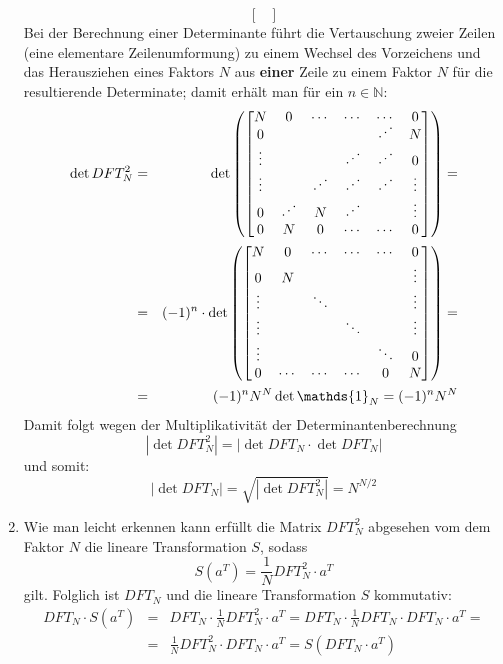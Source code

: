 \begin{enumerate}[1.]
\[\begin{bmatrix}
	\end{bmatrix} \]
	Bei der Berechnung einer Determinante führt die Vertauschung zweier Zeilen
	(eine elementare Zeilenumformung) zu einem Wechsel des Vorzeichens und das
	Herausziehen eines Faktors $N$ aus {\bf einer} Zeile zu einem Faktor $N$ für die
	resultierende Determinate; damit erhält man für ein $n \in \mathbb{N}$:
	\begin{eqnarray*}
	\det DFT_N^2 &=& \det \left( \begin{bmatrix}
		N      & 0      & \cdots & \cdots & \cdots & 0      \\
		0      &        &        &        & \Ddots & N      \\
		\vdots &        &        & \Ddots & \Ddots & 0      \\
		\vdots &        & \Ddots & \Ddots & \Ddots & \vdots \\
		0      & \Ddots & N      & \Ddots &        & \vdots \\
		0      & N      & 0      & \cdots & \cdots & 0      \\
	\end{bmatrix} \right) = \\
	& = & (-1)^n \cdot \det \left( \begin{bmatrix}
		N      & 0      & \cdots & \cdots & \cdots & 0      \\
		0      & N      &        &        &        & \vdots \\
		\vdots &       & \ddots &        &        & \vdots \\
		\vdots &        &        & \ddots &        & \vdots \\
		\vdots &        &        &        & \ddots & 0      \\
		0      & \cdots & \cdots & \cdots & 0      & N      \\
	\end{bmatrix} \right) = \\
	&=& (-1)^n N^N \det \mathds{1}_N = (-1)^n N^N \\
	\end{eqnarray*}
	Damit folgt wegen der Multiplikativität der Determinantenberechnung
	\[ | \det DFT_N^2 | = |\det DFT_N \cdot \det DFT_N| \]
	und somit:
	\[ | \det DFT_N | = \sqrt{|\det DFT_N^2|} = N^{N/2} \]

	\item Wie man leicht erkennen kann erfüllt die Matrix $DFT_N^2$ abgesehen vom dem
	Faktor $N$ die lineare Transformation $S$, sodass
	\[ S(a^T) = \frac{1}{N} DFT_N^2 \cdot a^T \]
	gilt.
	Folglich ist $DFT_N$ und die lineare Transformation $S$ kommutativ:
	\begin{eqnarray*}
	DFT_N \cdot S(a^T) &=& DFT_N \cdot \frac{1}{N}DFT_N^2 \cdot a^T = DFT_N \cdot \frac{1}{N} DFT_N \cdot DFT_N \cdot a^T = \\
	&=& \frac{1}{N}DFT_N^2 \cdot DFT_N \cdot a^T = S(DFT_N \cdot a^T)
	\end{eqnarray*}


\end{enumerate}
